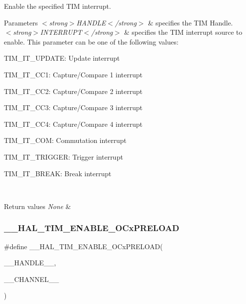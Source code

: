 Enable the specified T\+IM interrupt. 


\begin{DoxyParams}{Parameters}
{\em $<$strong$>$\+H\+A\+N\+D\+L\+E$<$/strong$>$} & specifies the T\+IM Handle. \\
\hline
{\em $<$strong$>$\+I\+N\+T\+E\+R\+R\+U\+P\+T$<$/strong$>$} & specifies the T\+IM interrupt source to enable. This parameter can be one of the following values\+: \begin{DoxyItemize}
\item T\+I\+M\+\_\+\+I\+T\+\_\+\+U\+P\+D\+A\+TE\+: Update interrupt \item T\+I\+M\+\_\+\+I\+T\+\_\+\+C\+C1\+: Capture/\+Compare 1 interrupt \item T\+I\+M\+\_\+\+I\+T\+\_\+\+C\+C2\+: Capture/\+Compare 2 interrupt \item T\+I\+M\+\_\+\+I\+T\+\_\+\+C\+C3\+: Capture/\+Compare 3 interrupt \item T\+I\+M\+\_\+\+I\+T\+\_\+\+C\+C4\+: Capture/\+Compare 4 interrupt \item T\+I\+M\+\_\+\+I\+T\+\_\+\+C\+OM\+: Commutation interrupt \item T\+I\+M\+\_\+\+I\+T\+\_\+\+T\+R\+I\+G\+G\+ER\+: Trigger interrupt \item T\+I\+M\+\_\+\+I\+T\+\_\+\+B\+R\+E\+AK\+: Break interrupt \end{DoxyItemize}
\\
\hline
\end{DoxyParams}

\begin{DoxyRetVals}{Return values}
{\em None} & \\
\hline
\end{DoxyRetVals}
\mbox{\label{group___t_i_m___exported___macros_ga199e848f0a301987a500faea0db2dd70}} 
\subsubsection{\texorpdfstring{\+\_\+\+\_\+\+H\+A\+L\+\_\+\+T\+I\+M\+\_\+\+E\+N\+A\+B\+L\+E\+\_\+\+O\+Cx\+P\+R\+E\+L\+O\+AD}{\_\_HAL\_TIM\_ENABLE\_OCxPRELOAD}}
{\footnotesize\ttfamily \#define \+\_\+\+\_\+\+H\+A\+L\+\_\+\+T\+I\+M\+\_\+\+E\+N\+A\+B\+L\+E\+\_\+\+O\+Cx\+P\+R\+E\+L\+O\+AD(\begin{DoxyParamCaption}\item[{}]{\+\_\+\+\_\+\+H\+A\+N\+D\+L\+E\+\_\+\+\_\+,  }\item[{}]{\+\_\+\+\_\+\+C\+H\+A\+N\+N\+E\+L\+\_\+\+\_\+ }\end{DoxyParamCaption})}

